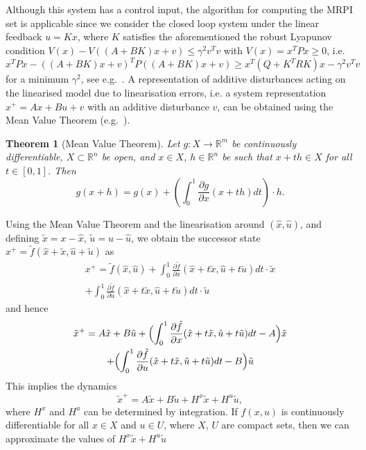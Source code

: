 \documentclass[journal]{IEEEtran}
\newcounter{thmcount}
\newtheorem{thm}[thmcount]{Theorem}
\theoremstyle{remark}
\theoremstyle{definition}
\begin{document}
%
Although this system has a control input, the algorithm for computing the MRPI set is applicable since 
we consider the closed loop system under the linear feedback  $u=Kx$, where $K$ satisfies the aforementioned the robust 
Lyapunov condition $V(x)-V((A+BK)x+v)\leq \gamma^2v^Tv$ with $V(x)=x^T P x\geq0$, i.e. $x^TPx - ((A+BK)x+v)^TP(
(A+BK)x+v)\geq x^T(Q+K^TRK)x -\gamma^2 v^Tv$ for a minimum  $\gamma^2$, see e.g.~\cite{Boyd:94}.
%
A representation of additive disturbances acting on the linearised model due to linearisation errors, 
i.e. a system representation $x^+=Ax + Bu + v$ with an additive disturbance $v$, can be obtained using the
Mean Value Theorem (e.g.~\cite{Apostol:1974}).
%
%
\begin{thm}[Mean Value Theorem]\label{thm:mean:value:theorem}
Let $g :  X \rightarrow\mathbb R^m$ be continuously
differentiable, $ X\subset\mathbb R^n$ be open,
and $x \in X$, $h \in\mathbb R^n$ be such that 
$x + th \in X$ for all $t\in [0 ,1]$. Then
\begin{equation}
  g(x+h) = g(x) + \left(\int_0^1 \frac{\partial g}{\partial x}(x+th)dt\right)\cdot h.
\end{equation}
\end{thm}
%
%
Using the Mean Value Theorem and the linearisation around $(\hat{x},\hat{u})$, and defining 
$\tilde{x} = x - \hat{x}$, $\tilde{u} = u - \hat{u}$, we obtain the successor state $x^+ = 
\tilde{f}(\hat{x} + \tilde{x},\hat{u} + \tilde{u})$ as
%
\begin{multline*}
x^+= \tilde f(\hat x, \hat u) 
+ \int_0^1\frac{\partial\tilde f}{\partial x}(\hat x + t\tilde x,
\hat u + t\tilde u) dt \cdot \tilde x  \\
+ \int_0^1\frac{\partial\tilde f}{\partial u}(\hat x + t\tilde x,\hat u+
t\tilde{u}) dt\cdot \tilde{u}
\end{multline*}
%
and hence
%
\begin{multline*}
\tilde x^+ = A\tilde{x} + B \tilde{u} +\Bigl(
\int_0^1\frac{\partial\tilde f}{\partial x}(\hat x + t\tilde x,\hat u
             + t\tilde{u})dt - A \Bigr)\tilde x 
\\ 
+\Bigl(\int_0^1\frac{\partial\tilde f}{\partial u}(\hat x +
  t\tilde x,\hat u + t\tilde{u})dt - B\Bigr)\tilde{u}
\end{multline*}
%
This implies the dynamics
%
\[
\tilde x^+ = A\tilde x+B\tilde{u} + H^x\tilde{x} + H^u \tilde{u}, 
\]
%
where $H^x$ and $H^u$ can be determined by integration. 
%
If $f(x,u)$ is continuously differentiable for all $x\in X$ and $u\in U$, where
$X$, $U$ are compact sets, then we can approximate the values of $H^x \tilde{x}+ H^u \tilde{u}$ 
\end{document}
